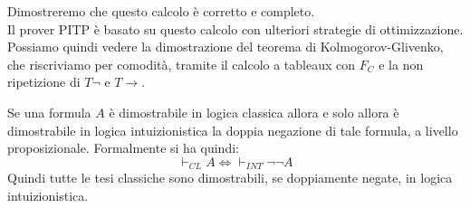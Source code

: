\documentclass[a4paper,12pt, oneside]{book}
\begin{document}
Dimostreremo che questo calcolo è corretto e completo.\\
Il prover PITP è basato su questo calcolo con ulteriori strategie di
ottimizzazione. \\
Possiamo quindi vedere la dimostrazione del teorema di Kolmogorov-Glivenko, che
riscriviamo per comodità, tramite il calcolo a tableaux con $F_C$ e la non
ripetizione di $T\neg$ e $T\to$.
\begin{teorema}
  Se una formula $A$ è dimostrabile in logica classica allora e solo allora è
  dimostrabile in logica intuizionistica la doppia negazione di tale formula, a
  livello proposizionale. Formalmente si ha quindi:
  \[\vdash_{CL} A \iff \vdash_{INT}\neg\neg A\]
  Quindi tutte le tesi classiche sono dimostrabili, se doppiamente negate, in
  logica intuizionistica.
\end{teorema}
\end{document}
